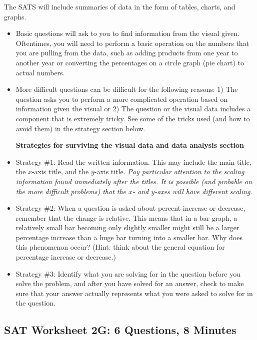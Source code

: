 \hrulefill

The SATS will include summaries of data in the form of tables, charts, and graphs.

\begin{itemize}
\item Basic questions will ask to you to find information from the visual given. Oftentimes, you will need to perform a basic operation on the numbers that you are pulling from the data, such as adding products from one year to another year or converting the percentages on a circle graph (pie chart) to actual numbers.
\vfill\item More difficult questions can be difficult for the following reasons: 1) The question asks you to perform a more complicated operation based on information given the visual or 2) The question or the visual data includes a component that is extremely tricky. See some of the tricks used (and how to avoid them) in the strategy section below.

\textbf{Strategies for surviving the visual data and data analysis section}

\item Strategy \#1: Read the written information. This may include the main title, the $x$-axis title, and the $y$-axis title. \textit{Pay particular attention to the scaling information found immediately after the titles. It is possible (and probable on the more difficult problems) that the $x$- and $y$-axes will have different scaling.}

\vfill
\item Strategy \#2: When a question is asked about percent increase or decrease, remember that the change is relative. This means that in a bar graph, a relatively small bar becoming only slightly smaller might still be a larger percentage increase than a huge bar turning into a smaller bar. Why does this phenomenon occur? (Hint: think about the general equation for percentage increase or decrease.) \hrulefill

\vfill
\item Strategy \#3: Identify what you are solving for in the question before you solve the problem, and after you have solved for an answer, check to make sure that your answer actually represents what you were asked to solve for in the question.
\end{itemize}

\vfill
\newpage
\subsection{SAT Worksheet 2G: 6 Questions, 8 Minutes}

